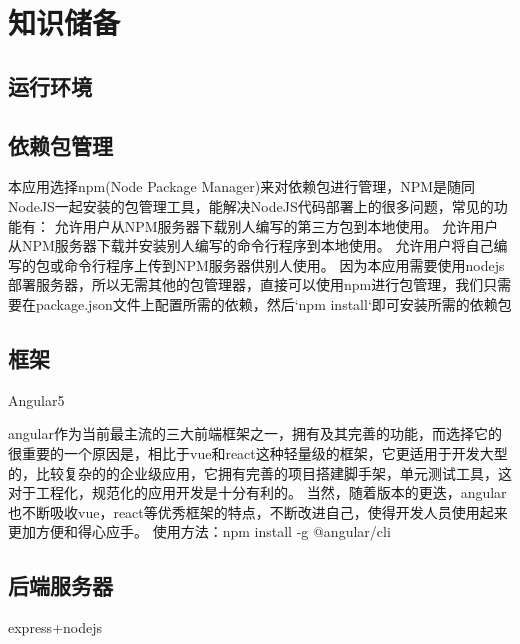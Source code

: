 \chapter{知识储备}
\section{运行环境}
\label{sec:environment}

\section{依赖包管理}
\label{sec:dependencies_manage}
本应用选择npm(Node Package Manager)来对依赖包进行管理，NPM是随同NodeJS一起安装的包管理工具，能解决NodeJS代码部署上的很多问题，常见的功能有：
允许用户从NPM服务器下载别人编写的第三方包到本地使用。
允许用户从NPM服务器下载并安装别人编写的命令行程序到本地使用。
允许用户将自己编写的包或命令行程序上传到NPM服务器供别人使用。
因为本应用需要使用nodejs部署服务器，所以无需其他的包管理器，直接可以使用npm进行包管理，我们只需要在package.json文件上配置所需的依赖，然后`npm install`即可安装所需的依赖包

\section{框架}
\label{sec:frame}
Angular5

angular作为当前最主流的三大前端框架之一，拥有及其完善的功能，而选择它的很重要的一个原因是，相比于vue和react这种轻量级的框架，它更适用于开发大型的，比较复杂的的企业级应用，它拥有完善的项目搭建脚手架，单元测试工具，这对于工程化，规范化的应用开发是十分有利的。
当然，随着版本的更迭，angular也不断吸收vue，react等优秀框架的特点，不断改进自己，使得开发人员使用起来更加方便和得心应手。
使用方法：npm install -g @angular/cli

\section{后端服务器}
\label{sec:server}
express+nodejs

